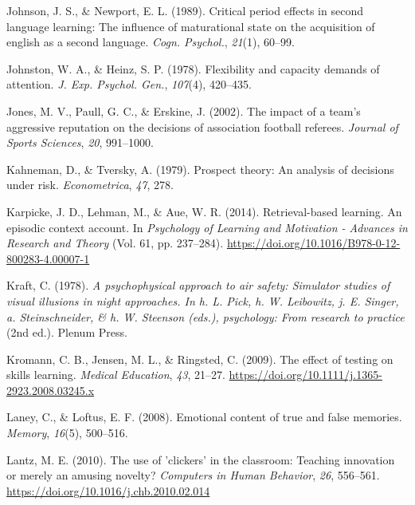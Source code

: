 \documentclass[
]{krantz}
\newlength{\cslhangindent}
\newlength{\cslentryspacingunit} %
\newenvironment{CSLReferences}[2] %
 {%
  \setlength{\parindent}{0pt}
  \ifodd #1
  \let\oldpar\par
  \def\par{\hangindent=\cslhangindent\oldpar}
  \fi
  \setlength{\parskip}{#2\cslentryspacingunit}
 }%
 {}
\begin{document}
\begin{CSLReferences}{1}{0}
\leavevmode{}%
Johnson, J. S., \& Newport, E. L. (1989). Critical period effects in second language learning: The influence of maturational state on the acquisition of english as a second language. \emph{Cogn. Psychol.}, \emph{21}(1), 60--99.

\leavevmode{}%
Johnston, W. A., \& Heinz, S. P. (1978). Flexibility and capacity demands of attention. \emph{J. Exp. Psychol. Gen.}, \emph{107}(4), 420--435.

\leavevmode{}%
Jones, M. V., Paull, G. C., \& Erskine, J. (2002). The impact of a team's aggressive reputation on the decisions of association football referees. \emph{Journal of Sports Sciences}, \emph{20}, 991--1000.

\leavevmode{}%
Kahneman, D., \& Tversky, A. (1979). Prospect theory: An analysis of decisions under risk. \emph{Econometrica}, \emph{47}, 278.

\leavevmode{}%
Karpicke, J. D., Lehman, M., \& Aue, W. R. (2014). Retrieval-based learning. An episodic context account. In \emph{Psychology of Learning and Motivation - Advances in Research and Theory} (Vol. 61, pp. 237--284). \url{https://doi.org/10.1016/B978-0-12-800283-4.00007-1}

\leavevmode{}%
Kraft, C. (1978). \emph{A psychophysical approach to air safety: Simulator studies of visual illusions in night approaches. In h. L. Pick, h. W. Leibowitz, j. E. Singer, a. Steinschneider, \& h. W. Steenson (eds.), psychology: From research to practice} (2nd ed.). Plenum Press.

\leavevmode{}%
Kromann, C. B., Jensen, M. L., \& Ringsted, C. (2009). The effect of testing on skills learning. \emph{Medical Education}, \emph{43}, 21--27. \url{https://doi.org/10.1111/j.1365-2923.2008.03245.x}

\leavevmode{}%
Laney, C., \& Loftus, E. F. (2008). Emotional content of true and false memories. \emph{Memory}, \emph{16}(5), 500--516.

\leavevmode{}%
Lantz, M. E. (2010). The use of 'clickers' in the classroom: Teaching innovation or merely an amusing novelty? \emph{Computers in Human Behavior}, \emph{26}, 556--561. \url{https://doi.org/10.1016/j.chb.2010.02.014}


\end{CSLReferences}
\end{document}
